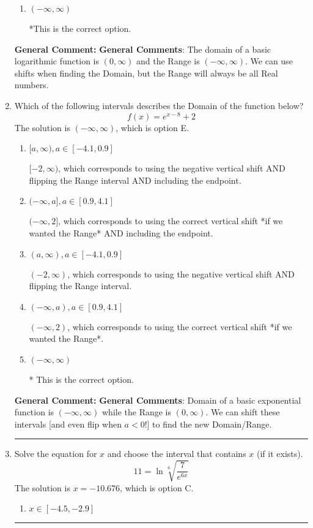 \documentclass{extbook}[14pt]
\newcommand{\litem}[1]{\item #1

\rule{\textwidth}{0.4pt}}
\begin{document}
\begin{enumerate}
{\begin{enumerate}[label=\Alph*.]
$[-3, \infty)$, which corresponds to using the negative of the horizontal shift AND including the endpoint.
\item \( (-\infty, \infty) \)

*This is the correct option.
\end{enumerate}

\textbf{General Comment:} \textbf{General Comments}: The domain of a basic logarithmic function is $(0, \infty)$ and the Range is $(-\infty, \infty)$. We can use shifts when finding the Domain, but the Range will always be all Real numbers.
}
\litem{
Which of the following intervals describes the Domain of the function below?
\[ f(x) = e^{x-8}+2 \]The solution is \( (-\infty, \infty) \), which is option E.\begin{enumerate}[label=\Alph*.]
\item \( [a, \infty), a \in [-4.1, 0.9] \)

$[-2, \infty)$, which corresponds to using the negative vertical shift AND flipping the Range interval AND including the endpoint.
\item \( (-\infty, a], a \in [0.9, 4.1] \)

$(-\infty, 2]$, which corresponds to using the correct vertical shift *if we wanted the Range* AND including the endpoint.
\item \( (a, \infty), a \in [-4.1, 0.9] \)

$(-2, \infty)$, which corresponds to using the negative vertical shift AND flipping the Range interval.
\item \( (-\infty, a), a \in [0.9, 4.1] \)

$(-\infty, 2)$, which corresponds to using the correct vertical shift *if we wanted the Range*.
\item \( (-\infty, \infty) \)

* This is the correct option.
\end{enumerate}

\textbf{General Comment:} \textbf{General Comments}: Domain of a basic exponential function is $(-\infty, \infty)$ while the Range is $(0, \infty)$. We can shift these intervals [and even flip when $a<0$!] to find the new Domain/Range.
}
\litem{
 Solve the equation for $x$ and choose the interval that contains $x$ (if it exists).
\[  11 = \ln{\sqrt[6]{\frac{7}{e^{6x}}}} \]The solution is \( x = -10.676 \), which is option C.\begin{enumerate}[label=\Alph*.]
\item \( x \in [-4.5, -2.9] \)


\end{enumerate}}
\end{enumerate}
\end{document}
